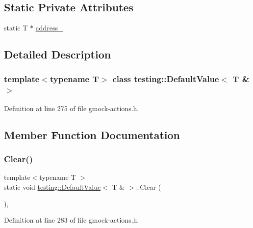 \subsection*{Static Private Attributes}
\begin{DoxyCompactItemize}
\item 
static T $\ast$ \hyperlink{classtesting_1_1DefaultValue_3_01T_01_6_01_4_a320c8ae0a0e290d9058dfaca1d65f02f}{address\+\_\+}
\end{DoxyCompactItemize}


\subsection{Detailed Description}
\subsubsection*{template$<$typename T$>$\newline
class testing\+::\+Default\+Value$<$ T \& $>$}



Definition at line 275 of file gmock-\/actions.\+h.



\subsection{Member Function Documentation}
\mbox{\label{classtesting_1_1DefaultValue_3_01T_01_6_01_4_a3c8f9f81e591370f9b33798f58ca1a10}} 
\subsubsection{\texorpdfstring{Clear()}{Clear()}}
{\footnotesize\ttfamily template$<$typename T $>$ \\
static void \hyperlink{classtesting_1_1DefaultValue}{testing\+::\+Default\+Value}$<$ T \& $>$\+::Clear (\begin{DoxyParamCaption}{ }\end{DoxyParamCaption})\hspace{0.3cm}{\ttfamily [inline]}, {\ttfamily [static]}}



Definition at line 283 of file gmock-\/actions.\+h.


